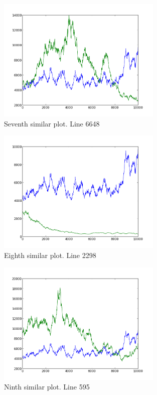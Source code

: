 \begin{figure}[h!]
    \centering
    \includegraphics[width=0.7\textwidth]{images/6648.png}
    \caption{Seventh similar plot.  Line 6648}
    \label{fig:ex1_7}
\end{figure}

\begin{figure}[h!]
    \centering
    \includegraphics[width=0.7\textwidth]{images/2298.png}
    \caption{Eighth similar plot.  Line 2298}
    \label{fig:ex1_8}
\end{figure}

\begin{figure}[h!]
    \centering
    \includegraphics[width=0.7\textwidth]{images/595.png}
    \caption{Ninth similar plot.  Line 595}
    \label{fig:ex1_9}
\end{figure}

